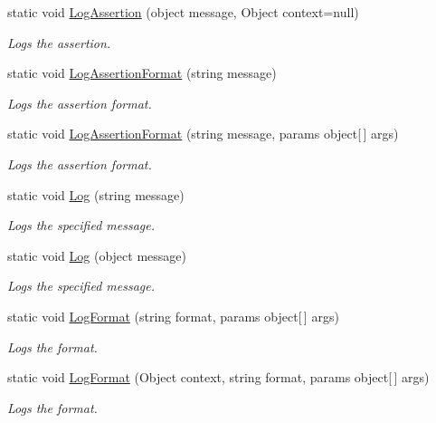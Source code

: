 \begin{DoxyCompactItemize}
static void \hyperlink{class_lerp2_a_p_i_1_1___debug_1_1_debug_a7016f1d36953ae8b972c097470dbe9d9}{Log\+Assertion} (object message, Object context=null)
\begin{DoxyCompactList}\small\item\em Logs the assertion. \end{DoxyCompactList}\item 
static void \hyperlink{class_lerp2_a_p_i_1_1___debug_1_1_debug_a66cb05555aa55c1baec1c5f808b8cac8}{Log\+Assertion\+Format} (string message)
\begin{DoxyCompactList}\small\item\em Logs the assertion format. \end{DoxyCompactList}\item 
static void \hyperlink{class_lerp2_a_p_i_1_1___debug_1_1_debug_a43507f317d16a3435175b1d0d1128cd3}{Log\+Assertion\+Format} (string message, params object\mbox{[}$\,$\mbox{]} args)
\begin{DoxyCompactList}\small\item\em Logs the assertion format. \end{DoxyCompactList}\item 
static void \hyperlink{class_lerp2_a_p_i_1_1___debug_1_1_debug_a5d42551aaf96e409013c3868109003dd}{Log} (string message)
\begin{DoxyCompactList}\small\item\em Logs the specified message. \end{DoxyCompactList}\item 
static void \hyperlink{class_lerp2_a_p_i_1_1___debug_1_1_debug_a2613f755093c4f7930c49399bf612e7c}{Log} (object message)
\begin{DoxyCompactList}\small\item\em Logs the specified message. \end{DoxyCompactList}\item 
static void \hyperlink{class_lerp2_a_p_i_1_1___debug_1_1_debug_a5ef6b80ff6d814a3425593a33185e73e}{Log\+Format} (string format, params object\mbox{[}$\,$\mbox{]} args)
\begin{DoxyCompactList}\small\item\em Logs the format. \end{DoxyCompactList}\item 
static void \hyperlink{class_lerp2_a_p_i_1_1___debug_1_1_debug_a43c56409acbbb39952c543110295f370}{Log\+Format} (Object context, string format, params object\mbox{[}$\,$\mbox{]} args)
\begin{DoxyCompactList}\small\item\em Logs the format. \end{DoxyCompactList}\item 

\end{DoxyCompactItemize}
